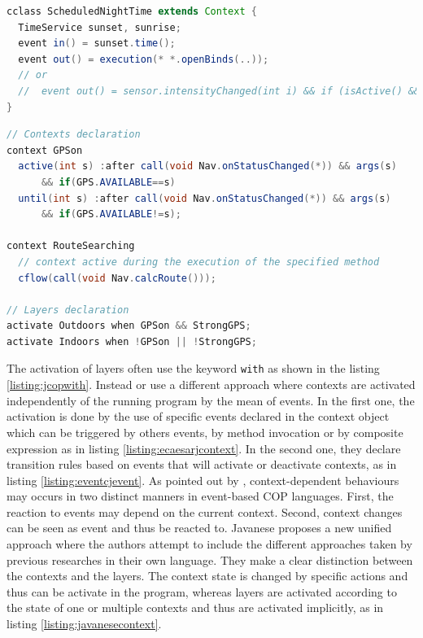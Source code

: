 \documentclass[a4paper]{article}
\begin{document}
\begin{lstlisting}[float, language=Java, caption=ECaesarJ context declaration, label={listing:ecaesarjcontext}]
cclass ScheduledNightTime extends Context {
  TimeService sunset, sunrise;
  event in() = sunset.time();
  event out() = execution(* *.openBinds(..));
  // or
  //  event out() = sensor.intensityChanged(int i) && if (isActive() && i > threshold);
}
\end{lstlisting}


\begin{lstlisting}[float, language=Java, caption=Javanese context declaration, label={listing:javanesecontext}]
// Contexts declaration
context GPSon
  active(int s) :after call(void Nav.onStatusChanged(*)) && args(s)
      && if(GPS.AVAILABLE==s)
  until(int s) :after call(void Nav.onStatusChanged(*)) && args(s)
      && if(GPS.AVAILABLE!=s);
      
context RouteSearching
  // context active during the execution of the specified method
  cflow(call(void Nav.calcRoute()));
  
// Layers declaration
activate Outdoors when GPSon && StrongGPS;
activate Indoors when !GPSon || !StrongGPS;
\end{lstlisting}

The activation of layers often use the keyword \lstinline|with| \cite{haupt_contextj:_2011} \cite{appeltauer_declarative_2013} \cite{kamina_eventcj:_2011} as shown in the listing \ref{listing:jcopwith}. Instead \cite{nunez_declarative_2009} or \cite{kamina_eventcj:_2011} use a different approach where contexts are activated independently of the running program by the mean of events. In the first one, the activation is done by the use of specific events declared in the context object which can be triggered by others events, by method invocation or by composite expression as in listing \ref{listing:ecaesarjcontext}. In the second one, they declare transition rules based on events that will activate or deactivate contexts, as in listing \ref{listing:eventcjevent}. As pointed out by \cite{nunez_declarative_2009}, context-dependent behaviours may occurs in two distinct manners in event-based COP languages. First, the reaction to events may depend on the current context. Second, context changes can be seen as event and thus be reacted to. Javanese \cite{kamina_unified_2013} proposes a new unified approach where the authors attempt to include the different approaches taken by previous researches in their own language. They make a clear distinction between the contexts and the layers. The context state is changed by specific actions and thus can be activate in the program, whereas layers are activated according to the state of one or multiple contexts and thus are activated implicitly, as in listing \ref{listing:javanesecontext}.
\end{document}
